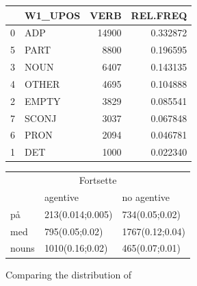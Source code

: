 \documentclass{article}
\begin{document}
\vspace{1cm}

\begin{minipage}{.3\textwidth}
  \centering
    \begin{tabular}{llrr}
    \toprule
    {} & W1\_UPOS &   VERB &  REL.FREQ \\
    \midrule
    0 &     ADP &  14900 &  0.332872 \\
    5 &    PART &   8800 &  0.196595 \\
    3 &    NOUN &   6407 &  0.143135 \\
    4 &   OTHER &   4695 &  0.104888 \\
    2 &   EMPTY &   3829 &  0.085541 \\
    7 &   SCONJ &   3037 &  0.067848 \\
    6 &    PRON &   2094 &  0.046781 \\
    1 &     DET &   1000 &  0.022340 \\
    \bottomrule
    \end{tabular}
\label{tab:fortsette_POS}
    \end{minipage}%
\hfill
\begin{minipage}{.5\textwidth}
  \centering
    \begin{tabular}{lll}
    \toprule
    \multicolumn{3}{c}{Fortsette}  \\
    
          & agentive & no agentive \\
    \midrule    
    på    &  213(0.014;0.005)        &  734(0.05;0.02)           \\
    med   & 795(0.05;0.02)  & 1767(0.12;0.04)           \\
    nouns &  1010(0.16;0.02)         &  465(0.07;0.01)          
    \end{tabular}
 \label{tab:fortsette_agentive}

\end{minipage}

\vspace{1cm}


Comparing the distribution of 



\newpage
% 
% 
\printbibliography
\end{document}
